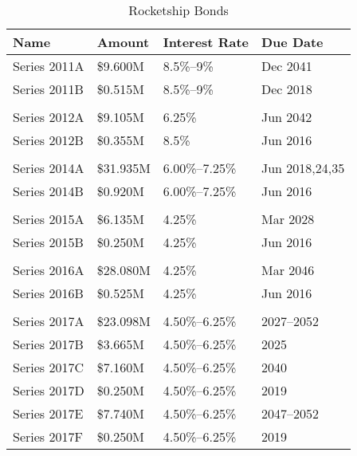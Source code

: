 \begin{table}[ht]
  \SingleSpacing
  \caption{Rocketship Bonds}\label{tab:rocketship_bonds}%
  \begin{tabular}{llll}
    \toprule
    Name             & Amount    & Interest Rate  & Due Date       \\
    \midrule
    Series 2011A     & \$9.600M  & 8.5\%–9\%      & Dec 2041       \\
    Series 2011B     & \$0.515M  & 8.5\%–9\%      & Dec 2018       \\
                                                                   \\
    Series 2012A     & \$9.105M  & 6.25\%         & Jun 2042       \\
    Series 2012B     & \$0.355M  & 8.5\%          & Jun 2016       \\
                                                                   \\
    Series 2014A     & \$31.935M & 6.00\%–7.25\%  & Jun 2018,24,35 \\
    Series 2014B     & \$0.920M  & 6.00\%–7.25\%  & Jun 2016       \\
                                                                   \\
    Series 2015A     & \$6.135M  & 4.25\%         & Mar 2028       \\
    Series 2015B     & \$0.250M  & 4.25\%         & Jun 2016       \\
                                                                   \\
    Series 2016A     & \$28.080M & 4.25\%         & Mar 2046       \\
    Series 2016B     & \$0.525M  & 4.25\%         & Jun 2016       \\
                                                                   \\
    Series 2017A     & \$23.098M & 4.50\%–6.25\%  & 2027–2052      \\
    Series 2017B     & \$3.665M  & 4.50\%–6.25\%  & 2025           \\
    Series 2017C     & \$7.160M  & 4.50\%–6.25\%  & 2040           \\
    Series 2017D     & \$0.250M  & 4.50\%–6.25\%  & 2019           \\
    Series 2017E     & \$7.740M  & 4.50\%–6.25\%  & 2047–2052      \\
    Series 2017F     & \$0.250M  & 4.50\%–6.25\%  & 2019           \\

\end{tabular}
\end{table}
